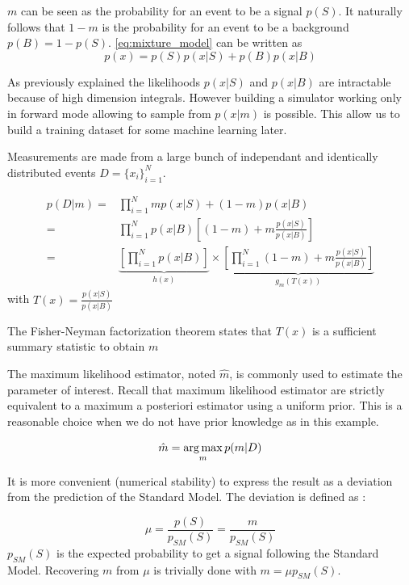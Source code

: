 $m$ can be seen as the probability for an event to be a signal $p(S)$. 
It naturally follows that $1-m$ is the probability for an event to be a background $p(B)=1-p(S)$.
\autoref{eq:mixture_model} can be written as
\begin{equation}
	p(x) = p(S)p(x|S) + p(B)p(x|B)
\end{equation}

As previously explained the likelihoods $p(x|S)$ and $p(x|B)$ are intractable because of high dimension integrals.
However building a simulator working only in forward mode allowing to sample from $p(x|m)$ is possible.
This allow us to build a training dataset for some machine learning later.

Measurements are made from a large bunch of independant and identically distributed events $D=\{x_i\}_{i=1}^N$.

\begin{align*}
	p(D|m) =& \prod_{i=1}^N m p(x|S) + (1-m) p(x|B) \\
	       =& \prod_{i=1}^N p(x|B) \left [(1-m) + m \frac{p(x|S)}{p(x|B)} \right ]\\
	       =& \underbrace{\left[ \prod_{i=1}^N p(x|B) \right ]}_{h(x)} \times 
	       \underbrace{\left [\prod_{i=1}^N (1-m) + m \frac{p(x|S)}{p(x|B)} \right ]}_{g_m(T(x))}
\end{align*}
with $T(x) = \frac{p(x|S)}{p(x|B)} $

The Fisher-Neyman factorization theorem \needcite states that $T(x)$ is a sufficient summary statistic to obtain $m$

The maximum likelihood estimator, noted $\hat m$, is commonly used to estimate the parameter of interest.
Recall that maximum likelihood estimator are strictly equivalent to a maximum a posteriori estimator using a uniform prior.
This is a reasonable choice when we do not have prior knowledge as in this example.

\begin{equation}
	\hat m = \operatorname*{arg\,max}_m p(m | D)
\end{equation}

It is more convenient (numerical stability) to express the result as a deviation from the prediction of the Standard Model.
The deviation is defined as :

\begin{equation}
	\mu = \frac{p(S)}{p_{SM}(S)} = \frac{m}{p_{SM}(S)}
\end{equation}
$p_{SM}(S)$ is the expected probability to get a signal following the Standard Model.
Recovering $m$ from $\mu$ is trivially done with $m = \mu p_{SM}(S)$.


